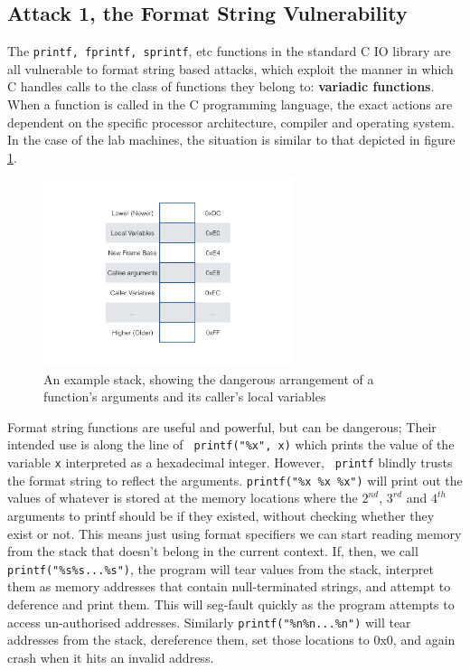 \subsection{Attack 1, the Format String Vulnerability}

The {\tt printf, fprintf, sprintf}, etc functions in the standard C IO library are all vulnerable to format string based
attacks, which exploit the manner in which C handles calls to the class of functions they belong to: \textbf{variadic
functions}\cite{vfunc}. When a function is called in the C programming language,\cite{call_conv} the exact actions are
dependent on the specific processor architecture, compiler and operating system. In the case of the lab machines, the
situation is similar to that depicted in figure \ref{fig_stack}.

\begin{figure}[ht] \centering \includegraphics[width = 0.65\textwidth]{./images/stack.jpg} \caption{An example stack,
showing the dangerous arrangement of a function's arguments and its caller's local variables} \label{fig_stack}
\end{figure}

Format string functions are useful and powerful, but can be dangerous; Their intended use is along the line of {\tt
printf("\%x", x)} which prints the value of the variable {\tt x} interpreted as a hexadecimal integer. However, {\tt
printf} blindly trusts the format string to reflect the arguments. {\tt printf("\%x \%x \%x")} will print out the values
of whatever is stored at the memory locations where the $2^{nd}$, $3^{rd}$ and $4^{th}$ arguments to printf should be if
they existed, without checking whether they exist or not. This means just using format specifiers we can start reading
memory from the stack that doesn't belong in the current context. If, then, we call {\tt printf("\%s\%s...\%s")}, the
program will tear values from the stack, interpret them as memory addresses that contain null-terminated strings, and
attempt to deference and print them. This will seg-fault quickly as the program attempts to access un-authorised
addresses. Similarly {\tt printf("\%n\%n...\%n")} will tear addresses from the stack, dereference them, set those
locations to 0x0, and again crash when it hits an invalid address.

